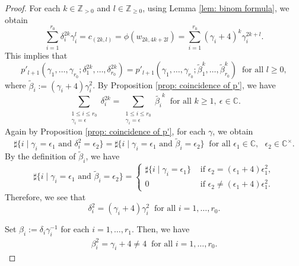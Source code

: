 \documentclass[12pt,a4paper]{amsart}
\theoremstyle{definition}
\numberwithin{equation}{subsection}
\begin{document}
\begin{proof}
  For each $k \in \mathbb{Z}_{> 0}$ and $l \in \mathbb{Z}_{\geq 0}$, using Lemma \ref{lem: binom formula}, we obtain
  \[
    \sum_{i=1}^{r_0} \delta_i^{2k} \gamma_i^l = c_{(2k,l)} = \phi(w_{2k,4k+2l}) = \sum_{i=1}^{r_0} (\gamma_i+4)^k \gamma_i^{2k+l}.
  \]
  This implies that
  \[
    p'_{l+1}(\gamma_1,\dots,\gamma_{r_0};\delta_1^{2k},\dots,\delta_{r_0}^{2k}) = p'_{l+1}(\gamma_1,\dots,\gamma_{r_0};\tilde{\beta}_1^{k},\dots,\tilde{\beta}_{r_0}^{k}) \ \text{ for all } l \geq 0,
  \]
  where $\tilde{\beta}_i := (\gamma_i+4)\gamma_i^2$.
  By Proposition \ref{prop: coincidence of p'}, we have
  \[
    \sum_{\substack{1 \leq i \leq r_0\\\gamma_i=\epsilon}} \delta_i^{2k} = \sum_{\substack{1 \leq i \leq r_0\\\gamma_i=\epsilon}} \tilde{\beta_i}^k \ \text{ for all } k \geq 1, \ \epsilon \in \mathbb{C}.
  \]
  Again by Proposition \ref{prop: coincidence of p'}, for each $\gamma$, we obtain
  \[
    \sharp\{ i \mid \gamma_i = \epsilon_1 \text{ and } \delta_i^2 = \epsilon_2 \} = \sharp\{ i \mid \gamma_i = \epsilon_1 \text{ and } \tilde{\beta}_i = \epsilon_2 \} \ \text{ for all } \epsilon_1 \in \mathbb{C}, \text{ } \epsilon_2 \in \mathbb{C}^\times.
  \]
  By the definition of $\tilde{\beta}_i$, we have
  \[
    \sharp\{ i \mid \gamma_i = \epsilon_1 \text{ and } \tilde{\beta}_i = \epsilon_2 \} = \begin{cases}
      \sharp\{ i \mid \gamma_i = \epsilon_1 \} & \text{ if } \epsilon_2 = (\epsilon_1+4)\epsilon_1^2, \\
      0 & \text{ if } \epsilon_2 \neq (\epsilon_1+4)\epsilon_1^2.
    \end{cases}
  \]
  Therefore, we see that
  \[
    \delta_i^2 = (\gamma_i+4)\gamma_i^2 \ \text{ for all } i = 1,\dots,r_0.
  \]
  
  Set $\beta_i := \delta_i \gamma_i^{-1}$ for each $i = 1,\dots,r_1$.
  Then, we have
  \begin{align}\label{eq: beta = gamma + 4 neq 4}
    \beta_i^2 = \gamma_i + 4 \neq 4 \ \text{ for all } i = 1,\dots,r_0.
  \end{align}


\end{proof}
\end{document}
